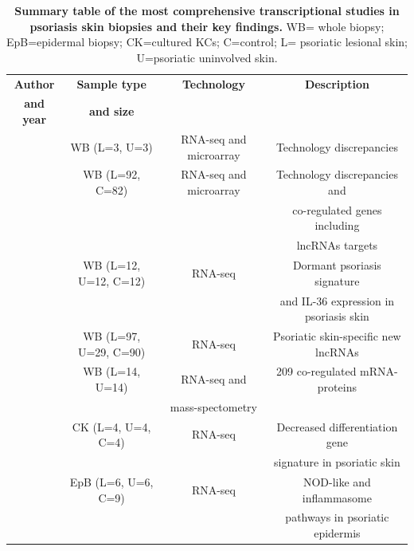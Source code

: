 \begin{table}[htbp]
\centering
\begin{tabular}{@{} c c c c}
\toprule
\textbf{Author}        & \textbf{Sample type} & \textbf{Technology} & \textbf{Description}\\
\textbf{and year }     & \textbf{and size}    &                     &                      \\
\midrule
\midrule
\parencite{Jaabari2011}	   & WB (L=3, U=3)         & RNA-seq and microarray & Technology discrepancies     \\
\parencite{Li2014}	       & WB (L=92, C=82)       & RNA-seq and microarray & Technology discrepancies and   \\
                           &                       &                        & co-regulated genes including \\
													 &                       &                        & lncRNAs targets               \\
\parencite{Keermann2015}	 & WB (L=12, U=12, C=12) & RNA-seq                & Dormant psoriasis signature  \\
                           &                       &                        & and IL-36 expression in psoriasis skin \\ 
\parencite{Tsoi2015}	     & WB (L=97, U=29, C=90) & RNA-seq                & Psoriatic skin-specific new lncRNAs\\
\parencite{Swindell2015}   & WB (L=14, U=14)       & RNA-seq and            & 209 co-regulated mRNA-proteins \\
                           &                       & mass-spectometry       &                                \\
\parencite{Swindell2017}	 & CK (L=4, U=4, C=4)    & RNA-seq                & Decreased differentiation gene \\
                           &                       &                        & signature in psoriatic skin \\
\parencite{Tervaniemi2016} & EpB (L=6, U=6, C=9)   & RNA-seq                & NOD-like and inflammasome \\
                           &                       &                        & pathways in psoriatic epidermis \\   
\bottomrule
\end{tabular}
\medskip %
\caption[Summary table of the most comprehensive transcriptional studies in psoriasis skin biopsies and their key findings.]{\textbf{Summary table of the most comprehensive transcriptional studies in psoriasis skin biopsies and their key findings.} WB= whole biopsy; EpB=epidermal biopsy; CK=cultured KCs; C=control; L= psoriatic lesional skin; U=psoriatic uninvolved skin.}
\label{tab:Skin_transcriptomics}
\end{table}
\bigskip %

